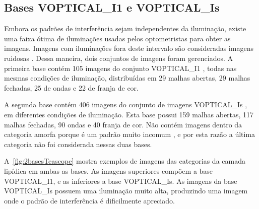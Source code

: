 

\subsection{Bases VOPTICAL\_I1 e VOPTICAL\_Is}
\label{subsec:basesI1eIs}

Embora os padrões de interferência sejam independentes da iluminação, existe uma faixa ótima de iluminações usadas pelos optometristas para obter as imagens. Imagens com iluminações fora deste intervalo são consideradas imagens ruidosas \cite{remeseiro2014methodology}. Dessa maneira, dois conjuntos de imagens foram gerenciados. A primeira base contém 105 imagens do conjunto VOPTICAL\_I1 \cite{voptical_gcuvarpa_i1}, todas nas mesmas condições de iluminação, distribuídas em 29 malhas abertas, 29 malhas fechadas, 25 de ondas e 22 de franja de cor.

A segunda base contém 406 imagens do conjunto de imagens VOPTICAL\_Is \cite{voptical_gcuvarpa_is}, em diferentes condições de iluminação. Esta base possui 159 malhas abertas, 117 malhas fechadas, 90 ondas e 40 franja de cor. Não contém imagens dentro da categoria amorfa porque é um padrão muito incomum \cite{garcia2013new}, e por esta razão a última categoria não foi considerada nessas duas bases.

A~\autoref{fig:2basesTeascope} mostra exemplos de imagens das categorias da camada lipídica em ambas as bases. As imagens superiores compõem a base VOPTICAL\_I1, e as inferiores a base VOPTICAL\_Is. As imagens da base VOPTICAL\_Is possuem uma iluminação muito alta, produzindo uma imagem onde o padrão de interferência é dificilmente apreciado.

